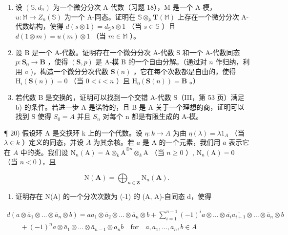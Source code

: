 \begin{enumerate}
\def\labelenumi{\alph{enumi})}
\item
  设 \((\mathbb{S}, d_{\mathbb{S}})\) 为一个微分分次 A-代数（习题 18），M 是一个 A-模， \(u: \mathbb{M} \to Z_{n}(\mathbb{S})\) 为一个 A-同态。证明在 \(\mathbb{S} \otimes_{\mathbb{A}} \mathbf{T}(\mathbb{M})\) 上存在一个微分分次 A-代数结构，使得 \(d(s \otimes 1) = d_{\mathbb{S}} s \otimes 1\) （当 \(s \in \mathbb{S}\) ）且 \(d(1 \otimes m) = u(m) \otimes 1\) （当 \(m \in \mathbb{M}\) ）。
\item
  设 B 是一个 A-代数。证明存在一个微分分次 A-代数 S 和一个 A-代数同态 \(p: \mathbf{S}_{0} \to \mathbf{B}\) ，使得 \((\mathbf{S}, p)\) 是 A-模 B 的一个自由分解。（通过对 \(n\) 作归纳，利用 \(a\) )，构造一个微分分次代数 \(\mathbf{S}(n)\) ，它在每个次数都是自由的，使得 \(\mathrm{H}_{i}(\mathbf{S}(n)) = 0\) （当 \(0 < i < n\) ）且 \(\mathrm{H}_{0}(\mathbf{S}(n)) = \mathbf{B}\) 。）
\item
  若代数 B 是交换的，证明可以找到一个交错 A-代数 S（III，第 53 页）满足 b) 的条件。若进一步 A 是诺特的，且 B 是 A 关于一个理想的商，证明可以找到 S 使得 \(S_{0} = A\) 并且 \(S_{n}\) 对每个 n 都是有限生成的 A-模。
\end{enumerate}

¶ 20) 假设环 A 是交换环 k 上的一个代数。设 \(\eta: k \to A\) 为由 \(\eta(\lambda) = \lambda 1_{A}\) （当 \(\lambda \in k\) ）定义的同态，并设 \(\overline{A}\) 为其余核。若 \(a\) 是 A 的一个元素，我们用 \(\overline{a}\) 表示它在 \(\overline{A}\) 中的类。我们设 \(\mathrm{N}_{n}(\mathrm{A}) = \mathrm{A} \otimes_{k} \overline{\mathrm{A}}^{\otimes n} \otimes_{k} \mathrm{A}\) （当 \(n \geqslant 0\) ）, \(\mathrm{N}_{n}(\mathrm{A}) = 0\) （当 \(n < 0\) ），且

\[
\mathrm{N} (\mathbf {A}) = \bigoplus_ {n \in \mathbf {Z}} \mathrm{N} _ {n} (\mathbf {A}).
\]

\begin{enumerate}
\def\labelenumi{\alph{enumi})}
\tightlist
\item
  证明存在 N(A) 的一个分次次数为 (-1) 的 (A, A)-自同态 d，使得
\end{enumerate}

\[
\begin{array}{l} d (a \otimes \bar {a} _ {1} \otimes \dots \otimes \bar {a} _ {n} \otimes b) = a a _ {1} \otimes \bar {a} _ {2} \otimes \dots \otimes \bar {a} _ {n} \otimes b + \sum_ {i = 1} ^ {n - 1} (- 1) ^ {i} a \otimes \dots \otimes \overline {{a _ {i}}} \overline {{a _ {i + 1}}} \otimes \dots \otimes \bar {a} _ {n} \otimes b \\ \qquad + (- 1) ^ {n} a \otimes \bar {a} _ {1} \otimes \dots \otimes \bar {a} _ {n - 1} \otimes a _ {n} b \quad \text {for} \quad a, a _ {1},..., a _ {n}, b \in A \end{array}
\]

